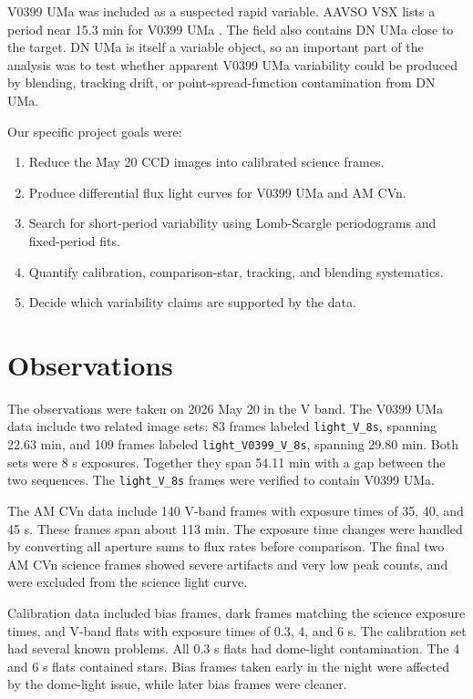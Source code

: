 \documentclass[11pt]{article}
\begin{document}
V0399 UMa was included as a suspected rapid variable. AAVSO VSX lists a period
near 15.3 min for V0399 UMa \cite{aavsoVSX}. The field also contains DN UMa
close to the target. DN UMa is itself a variable object, so an important part of
the analysis was to test whether apparent V0399 UMa variability could be
produced by blending, tracking drift, or point-spread-function contamination
from DN UMa.

Our specific project goals were:
\begin{enumerate}
  \item Reduce the May 20 CCD images into calibrated science frames.
  \item Produce differential flux light curves for V0399 UMa and AM CVn.
  \item Search for short-period variability using Lomb-Scargle periodograms and fixed-period fits.
  \item Quantify calibration, comparison-star, tracking, and blending systematics.
  \item Decide which variability claims are supported by the data.
\end{enumerate}

\section{Observations}

The observations were taken on 2026 May 20 in the V band. The V0399 UMa data
include two related image sets: 83 frames labeled \texttt{light\_V\_8s},
spanning 22.63 min, and 109 frames labeled \texttt{light\_V0399\_V\_8s},
spanning 29.80 min. Both sets were 8 s exposures. Together they span
54.11 min with a gap between the two sequences. The \texttt{light\_V\_8s}
frames were verified to contain V0399 UMa.

The AM CVn data include 140 V-band frames with exposure times of 35, 40, and
45 s. These frames span about 113 min. The exposure time changes were handled by
converting all aperture sums to flux rates before comparison. The final two
AM CVn science frames showed severe artifacts and very low peak counts, and
were excluded from the science light curve.

Calibration data included bias frames, dark frames matching the science
exposure times, and V-band flats with exposure times of 0.3, 4, and 6 s. The
calibration set had several known problems. All 0.3 s flats had dome-light
contamination. The 4 and 6 s flats contained stars. Bias frames taken early in
the night were affected by the dome-light issue, while later bias frames were
cleaner.
\end{document}
